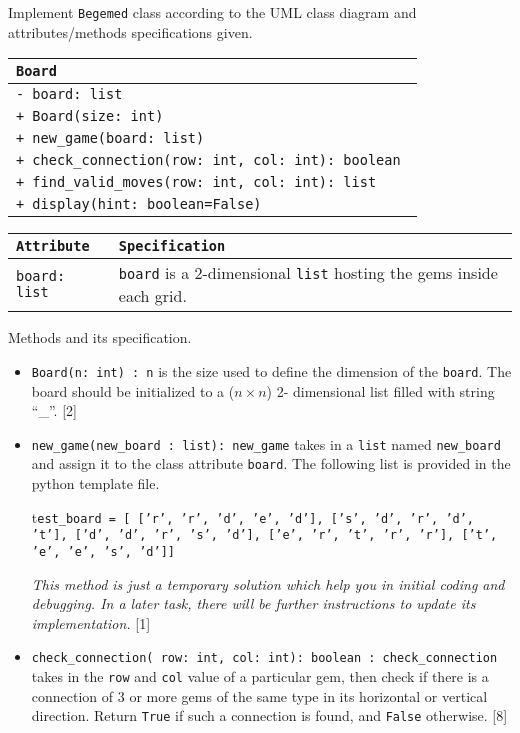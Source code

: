 Implement \texttt{Begemed} class according to the UML class diagram
and attributes/methods specifications given. 
\begin{center}
\begin{tabular}{|l|}
\hline 
\texttt{Board}\tabularnewline
\hline 
\texttt{- board: list }\tabularnewline
\hline 
\texttt{+ Board(size: int)}\tabularnewline
\texttt{+ new\_game(board: list) }\tabularnewline
\texttt{+ check\_connection(row: int, col: int): boolean }\tabularnewline
\texttt{+ find\_valid\_moves(row: int, col: int): list}\tabularnewline
\texttt{+ display(hint: boolean=False)}\tabularnewline
\hline 
\end{tabular}
\par\end{center}

\begin{center}
\begin{tabular}{|l|l|}
\hline 
\texttt{\textbf{Attribute}} & \texttt{\textbf{Specification}}\tabularnewline
\hline 
\texttt{board: list} & \texttt{board} is a 2-dimensional \texttt{list} hosting the gems inside
each grid. \tabularnewline
\hline 
\end{tabular}
\par\end{center}

Methods and its specification.
\begin{itemize}
\item \texttt{Board(n: int) : n} is the size used to define the dimension
of the \texttt{board}. The board should be initialized to a ($n\times n$)
2- dimensional list filled with string \textquotedblleft \_\textquotedblright .
\hfill{}{[}2{]}
\item \texttt{new\_game(new\_board : list): new\_game} takes in a \texttt{list}
named \texttt{new\_board} and assign it to the class attribute \texttt{board}.
The following list is provided in the python template file. 

t\texttt{est\_board = {[} {[}'r', 'r', 'd', 'e', 'd'{]}, {[}'s', 'd',
'r', 'd', 't'{]}, {[}'d', 'd', 'r', 's', 'd'{]}, {[}'e', 'r', 't',
'r', 'r'{]}, {[}'t', 'e', 'e', 's', 'd'{]}{]} }

\emph{This method is just a temporary solution which help you in initial
coding and debugging. In a later task, there will be further instructions
to update its implementation.} \hfill{}{[}1{]}
\item \texttt{check\_connection( row: int, col: int): boolean : check\_connection}
takes in the \texttt{row} and \texttt{col} value of a particular gem,
then check if there is a connection of 3 or more gems of the same
type in its horizontal or vertical direction. Return \texttt{True}
if such a connection is found, and \texttt{False} otherwise. \hfill{}{[}8{]}
\end{itemize}

